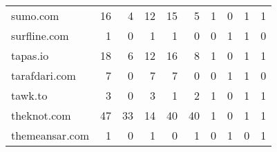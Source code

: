 \begin{tabular}{lrrrrrrrrr}
                   sumo.com &                               16 &                                  4 &                                     12 &                           15 &                           5 &                                   1 &                                      0 &                             1 &                            1 \\
               surfline.com &                                1 &                                  0 &                                      1 &                            1 &                           0 &                                   0 &                                      1 &                             1 &                            0 \\
                   tapas.io &                               18 &                                  6 &                                     12 &                           16 &                           8 &                                   1 &                                      0 &                             1 &                            1 \\
              tarafdari.com &                                7 &                                  0 &                                      7 &                            7 &                           0 &                                   0 &                                      1 &                             1 &                            0 \\
                    tawk.to &                                3 &                                  0 &                                      3 &                            1 &                           2 &                                   1 &                                      0 &                             1 &                            1 \\
                theknot.com &                               47 &                                 33 &                                     14 &                           40 &                          40 &                                   1 &                                      0 &                             1 &                            1 \\
             themeansar.com &                                1 &                                  0 &                                      1 &                            0 &                           1 &                                   0 &                                      1 &                             0 &                            1 \\

\end{tabular}
